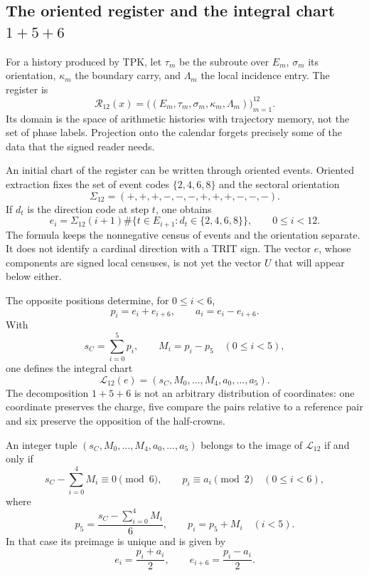 \subsection{The oriented register and the integral chart \texorpdfstring{\(1+5+6\)}{1+5+6}}
\label{x_reciprocidad:subsec:k-registro-integral}

For a history produced by TPK, let \(\tau_m\) be the subroute over
\(E_m\), \(\sigma_m\) its orientation, \(\kappa_m\) the boundary
carry, and \(\Lambda_m\) the local incidence entry. The register is
\[
 \mathcal R_{12}(x)=
 \bigl((E_m,\tau_m,\sigma_m,\kappa_m,\Lambda_m)\bigr)_{m=1}^{12}.
\]
Its domain is the space of arithmetic histories with trajectory memory, not the set of
phase labels. Projection onto the calendar forgets precisely some
of the data that the signed reader needs.

An initial chart of the register can be written through oriented
events. Oriented extraction fixes the set of event codes
\(\{2,4,6,8\}\) and the sectoral orientation
\[
 \Sigma_{12}=(+,+,+,-,-,-,+,+,+,-,-,-).
\]
If \(d_t\) is the direction code at step \(t\), one obtains
\[
 e_i=\Sigma_{12}(i+1)
 \#\{t\in E_{i+1}:d_t\in\{2,4,6,8\}\},
 \qquad0\leq i<12.
\]
The formula keeps the nonnegative census of events and the
orientation separate. It does not identify a cardinal direction with a TRIT sign. The
vector \(e\), whose components are signed local censuses, is not yet
the vector \(U\) that will appear below either.

The opposite positions determine, for \(0\leq i<6\),
\[
 p_i=e_i+e_{i+6},\qquad a_i=e_i-e_{i+6}.
\]
With
\[
 s_C=\sum_{i=0}^{5}p_i,\qquad M_i=p_i-p_5\quad(0\leq i<5),
\]
one defines the integral chart
\[
 \mathcal L_{12}(e)
 =(s_C,M_0,\ldots,M_4,a_0,\ldots,a_5).
\]
The decomposition \(1+5+6\) is not an arbitrary distribution of coordinates:
one coordinate preserves the charge, five compare the pairs relative to a
reference pair and six preserve the opposition of the half-crowns.

\begin{lemma}
\label{x_reciprocidad:lem:k-carta-integral}
An integer tuple \((s_C,M_0,\ldots,M_4,a_0,\ldots,a_5)\) belongs to the
image of \(\mathcal L_{12}\) if and only if
\[
 s_C-\sum_{i=0}^{4}M_i\equiv0\pmod6,
 \qquad p_i\equiv a_i\pmod2\quad(0\leq i<6),
\]
where
\[
 p_5=\frac{s_C-\sum_{i=0}^{4}M_i}{6},\qquad p_i=p_5+M_i\quad(i<5).
\]
In that case its preimage is unique and is given by
\[
 e_i=\frac{p_i+a_i}{2},\qquad e_{i+6}=\frac{p_i-a_i}{2}.
\]
\end{lemma}

